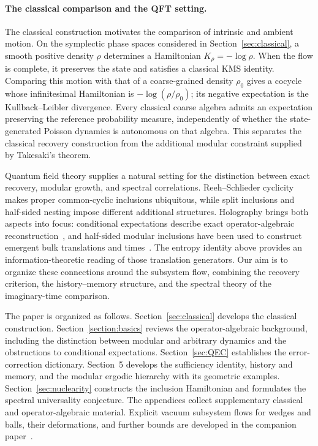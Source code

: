 \documentclass[a4paper,11pt]{article}
\theoremstyle{definition}
\begin{document}
\paragraph{The classical comparison and the QFT setting.}
The classical construction motivates the comparison of intrinsic and ambient motion. On the symplectic phase spaces considered in Section~\ref{sec:classical}, a smooth positive density $\rho$ determines a Hamiltonian $K_\rho=-\log\rho$. When the flow is complete, it preserves the state and satisfies a classical KMS identity. Comparing this motion with that of a coarse-grained density $\rho_0$ gives a cocycle whose infinitesimal Hamiltonian is $-\log(\rho/\rho_0)$; its negative expectation is the Kullback--Leibler divergence. Every classical coarse algebra admits an expectation preserving the reference probability measure, independently of whether the state-generated Poisson dynamics is autonomous on that algebra. This separates the classical recovery construction from the additional modular constraint supplied by Takesaki's theorem.

Quantum field theory supplies a natural setting for the distinction between exact recovery, modular growth, and spectral correlations. Reeh--Schlieder cyclicity makes proper common-cyclic inclusions ubiquitous, while split inclusions and half-sided nesting impose different additional structures. Holography brings both aspects into focus: conditional expectations describe exact operator-algebraic reconstruction~\cite{Faulkner2020}, and half-sided modular inclusions have been used to construct emergent bulk translations and times~\cite{LeutheusserLiu2023}. The entropy identity above provides an information-theoretic reading of those translation generators. Our aim is to organize these connections around the subsystem flow, combining the recovery criterion, the history--memory structure, and the spectral theory of the imaginary-time comparison.

The paper is organized as follows. Section~\ref{sec:classical} develops the classical construction. Section~\ref{section:basics} reviews the operator-algebraic background, including the distinction between modular and arbitrary dynamics and the obstructions to conditional expectations. Section~\ref{sec:QEC} establishes the error-correction dictionary. Section~5 develops the sufficiency identity, history and memory, and the modular ergodic hierarchy with its geometric examples. Section~\ref{sec:nuclearity} constructs the inclusion Hamiltonian and formulates the spectral universality conjecture. The appendices collect supplementary classical and operator-algebraic material. Explicit vacuum subsystem flows for wedges and balls, their deformations, and further bounds are developed in the companion paper~\cite{companionQFT}.
\end{document}
